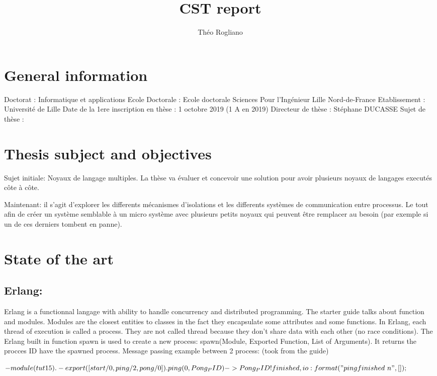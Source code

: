 \documentclass[11pt]{article} %
\title{CST report}
\author{Théo Rogliano}
\begin{document}
\maketitle

\section{General information}

Doctorat : Informatique et applications
Ecole Doctorale : Ecole doctorale Sciences Pour l'Ingénieur Lille Nord-de-France
Etablissement : Université de Lille
Date de la 1ere inscription en thèse : 1 octobre 2019 (1 A en 2019)
Directeur de thèse : Stéphane DUCASSE
Sujet de thèse : 

\section{Thesis subject and objectives}
Sujet initiale: Noyaux de langage multiples. La thèse va évaluer et concevoir une solution pour avoir plusieurs noyaux de langages executés côte à côte.

Maintenant: il s'agit d'explorer les differents mécanismes d'isolations et les differents systèmes de communication entre processus. Le tout afin de créer un système semblable à un micro système avec plusieurs petits noyaux qui peuvent être remplacer au besoin (par exemple si un de ces derniers tombent en panne).

\section{State of the art}
\subsection{Erlang:}
Erlang is a functionnal langage with ability to handle concurrency and distributed programming.
The starter guide talks about function and modules. Modules are the closest entities to classes in the fact they encapsulate some attributes and some functions.
In Erlang, each thread of execution is called a process. They are not called thread because they don't share data with each other (no race conditions).
The Erlang built in function spawn is used to create a new process: spawn(Module, Exported Function, List of Arguments). 
It returns the procces ID have the spawned process.
Message passing example between 2 process: (took from the guide)

$-module(tut15).
-export([start/0, ping/2, pong/0]).
ping(0, Pong_PID) ->
    Pong_PID ! finished,
    io:format("ping finished~n", []);$
    
\end{document}
